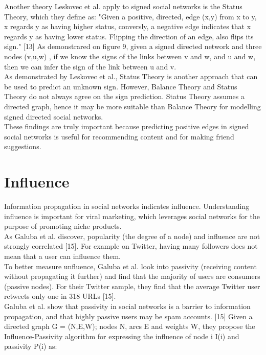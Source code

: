 \documentclass[conference,letterpaper]{IEEEtran}
\begin{document}
Another theory Leskovec et al. apply to signed social networks is the Status Theory, which they define as: "Given a positive, directed, edge (x,y) from x to y, x regards y as having higher status, conversly, a negative edge indicates that x regards y as having lower status. Flipping the direction of an edge, also flips its sign." [13] As demonstrared on figure 9, given a signed directed network and three nodes (v,u,w) , if we know the signs of the links between v and w, and u and w, then we can infer the sign of the link between u and v. \\
As demonstrated by Leskovec et al., Status Theory is another approach that can be used to predict an unknown sign. However, Balance Theory and Status Theory do not always agree on the sign prediction. Status Theory assumes a directed graph, hence it may be more suitable than Balance Theory for modelling signed directed social networks.\\
These findings are truly important because predicting positive edges in signed social networks is useful for recommending content and for making friend suggestions.\\

\section{Influence}

Information propagation in social networks indicates influence. Understanding influence is important for viral marketing, which leverages social networks for the purpose of promoting niche products.\\
As Galuba et al. discover, popularity (the degree of a node) and influence are not strongly correlated [15]. For example on Twitter, having many followers does not mean that a user can influence them. \\
To better measure unfluence, Galuba et al. look into passivity (receiving content without propagating it further) and find that the majority of users are consumers (passive nodes). For their Twitter sample, they find that the average Twitter user retweets only one in 318 URLs [15]. \\
Galuba et al. show that passivity in social networks is a barrier to information propagation, and that highly passive users may be spam accounts. [15]
Given a directed graph G = (N,E,W); nodes N, arcs E and weights W, they propose the Influence-Passivity algorithm for expressing the influence of node i I(i) and passivity P(i) as:\\
\end{document}
